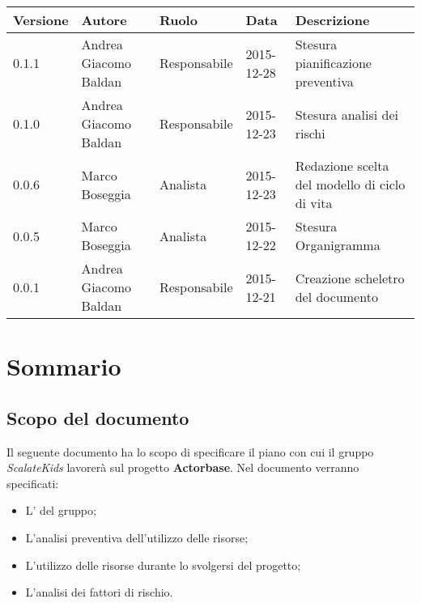 \documentclass{scalatekids-article}
\begin{document}
\begin{center}
  \begin{tabular}{| l | l | l | l | l |}
    \hline
    Versione & Autore & Ruolo & Data & Descrizione \\
    \hline
    0.1.1 & Andrea Giacomo Baldan & Responsabile & 2015-12-28 & Stesura pianificazione preventiva\\
    \hline
    0.1.0 & Andrea Giacomo Baldan & Responsabile & 2015-12-23 & Stesura analisi dei rischi \\
    \hline
    0.0.6 & Marco Boseggia & Analista & 2015-12-23 & Redazione scelta del modello di ciclo di vita\\
    \hline
    0.0.5 & Marco Boseggia & Analista & 2015-12-22 & Stesura Organigramma\\
    \hline
    0.0.1 & Andrea Giacomo Baldan & Responsabile & 2015-12-21 & Creazione scheletro del documento\\
    \hline
  \end{tabular}
\end{center}
\tableofcontents
\newpage
\section{Sommario}
\subsection{Scopo del documento}
Il seguente documento ha lo scopo di specificare il piano con cui il gruppo \textit{ScalateKids} lavorerà sul progetto \textbf{Actorbase}.
Nel documento verranno specificati:
\begin{itemize}
\item {L' del gruppo;}
\item {L'analisi preventiva dell'utilizzo delle risorse;}
\item {L'utilizzo delle risorse durante lo svolgersi del progetto;}
\item {L'analisi dei fattori di rischio.}
\end{itemize}
\prodPurpose
\glossExpl
\end{document}
